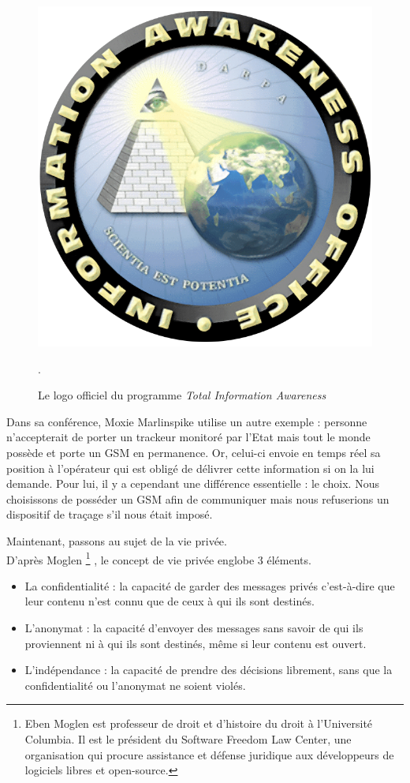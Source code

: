 \begin{figure}[h]
	\centering
	\includegraphics[scale=0.2]{figures/IAO-logo.png}
	\caption{\label{IAO_logo}Le logo officiel du programme \textit{Total Information Awareness}}.
\end{figure}

Dans sa conférence, Moxie Marlinspike utilise un autre exemple : personne n'accepterait de porter un trackeur monitoré par l'Etat mais tout le monde possède et porte un GSM en permanence. Or, celui-ci envoie en temps réel sa position à l'opérateur qui est obligé de délivrer cette information si on la lui demande. Pour lui, il y a cependant une différence essentielle : le choix. Nous choisissons de posséder un GSM afin de communiquer mais nous refuserions un dispositif de traçage s'il nous était imposé.
\newline


Maintenant, passons au sujet de la vie privée.\\
D'après Moglen \footnote{Eben Moglen est professeur de droit et d'histoire du droit à l'Université Columbia. Il est le président du Software Freedom Law Center, une organisation qui procure assistance et défense juridique aux développeurs de logiciels libres et open-source.} \cite{Moglen_part2}, le concept de vie privée englobe 3 éléments.
\begin{itemize}
  \item La confidentialité : la capacité de garder des messages privés c'est-à-dire que leur contenu n'est connu que de ceux à qui ils sont destinés.
  \item L'anonymat : la capacité d'envoyer des messages sans savoir de qui ils proviennent ni à qui ils sont destinés, même si leur contenu est ouvert.
  \item L'indépendance : la capacité de prendre des décisions librement, sans que la confidentialité ou l'anonymat ne soient violés.
\end{itemize}

